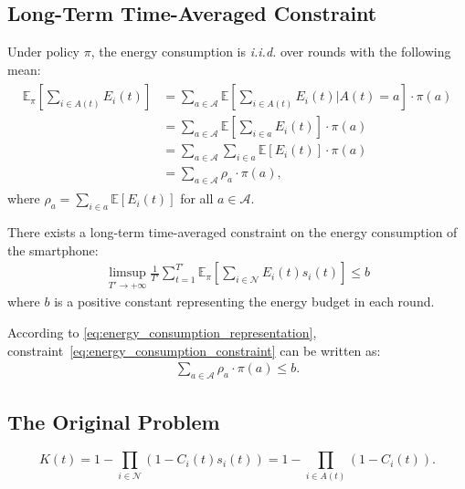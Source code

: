 \documentclass[12pt, a4paper]{article}
\begin{document}
\subsection{Long-Term Time-Averaged Constraint}

Under policy $\pi$, the energy consumption is \textit{i.i.d.} over rounds with the following mean:
\begin{align}
	\begin{split}
	\mathbb{E}_{\pi} \left[\sum_{i \in A(t)} E_i(t) \right] &= \sum\limits_{a \in \mathcal{A}} \mathbb{E} \left[ \sum\limits_{i \in A(t)} E_i (t) \bigg\vert A (t) = a \right] \cdot \pi(a)\\
	&= \sum\limits_{a \in \mathcal{A}} \mathbb{E} \left[ \sum\limits_{i \in a} E_i (t) \right] \cdot \pi(a)\\
	&= \sum\limits_{a \in \mathcal{A}} \sum\limits_{i \in a} \mathbb{E} \left[ E_i (t) \right] \cdot \pi(a)\\
	&= \sum\limits_{a \in \mathcal{A}} \rho_a \cdot \pi(a),
	\label{eq:energy_consumption_representation}
	\end{split}
\end{align}
where $\rho_a = \sum\limits_{i \in a} \mathbb{E} \left[ E_i (t) \right]$ for all $a \in \mathcal{A}$.

There exists a long-term time-averaged constraint on the energy consumption of the smartphone:
\begin{align}
	\mathop{\lim \sup}_{T' \to +\infty} \frac{1}{T'} \sum_{t=1}^{T'} \mathbb{E}_{\pi} \left[\sum_{i \in \mathcal{N}} E_i(t) s_i(t) \right] \leq b
	\label{eq:energy_consumption_constraint}
\end{align}
where $b$ is a positive constant representing the energy budget in each round.

According to \eqref{eq:energy_consumption_representation}, constraint~\eqref{eq:energy_consumption_constraint} can be written as:
\begin{align}
	\sum\limits_{a \in \mathcal{A}} \rho_a \cdot \pi(a) \leq b.
	\label{eq:energy_consumption_constraint_transformed}
\end{align}

\subsection{The Original Problem}

\[
K (t) = 1 - \prod\limits_{i \in \mathcal{N}} \left( 1 - C_i (t) s_i (t) \right) = 1 - \prod\limits_{i \in A(t)} \left( 1 - C_i (t) \right).
\]
\end{document}
